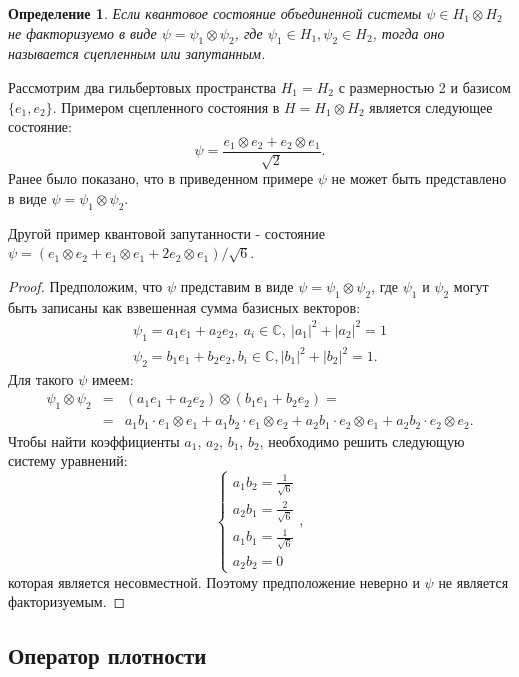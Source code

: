 \documentclass[%
master,         %
subf,           %
href,           %
,times         %
]{disser}
\numberwithin{equation}{section}
\numberwithin{figure}{section}
\newtheorem{definition}{Определение}[section]
\begin{document}
\begin{definition}
Если квантовое состояние объединенной системы $\psi\in H_1\otimes H_2$ не факторизуемо в виде  $\psi = \psi_1\otimes\psi_2$, где $\psi_1\in H_1, \psi_2\in H_2$, тогда оно называется сцепленным или запутанным. 
\end{definition}  
Рассмотрим два гильбертовых пространства $H_1 = H_2$ с размерностью 2 и базисом $\{e_1, e_2\}$. Примером сцепленного состояния в $H = H_1 \otimes H_2$ является следующее состояние: 
\[
\psi = \frac{e_1\otimes e_2 + e_2\otimes e_1}{\sqrt 2}.
\]
Ранее было показано, что в приведенном примере $\psi$ не может быть представлено в виде $\psi = \psi_1\otimes\psi_2$.

Другой пример квантовой запутанности - состояние $\psi = (e_1\otimes e_2 + e_1 \otimes e_1 + 2e_2 \otimes e_1) / \sqrt{6}$.

\begin{proof}
Предположим, что $\psi$ представим в виде $\psi = \psi_1\otimes\psi_2$, где 
$\psi_1$ и $\psi_2$ могут быть записаны как взвешенная сумма базисных векторов:
\begin{gather*}
	\psi_1 = a_1 e_1 + a_2 e_2,\ a_i\in \mathbb{C},\ |a_1|^2 + |a_2|^2 = 1 \\
	\psi_2 = b_1 e_1 + b_2 e_2, b_i\in \mathbb{C}, |b_1|^2 + |b_2|^2 = 1.
\end{gather*}
Для такого $\psi$ имеем:
\begin{eqnarray*}
	\psi_1 \otimes \psi_2 &=& (a_1 e_1 + a_2 e_2) \otimes (b_1 e_1 + b_2 e_2) = \\ &=&  
	a_1 b_1 \cdot e_1 \otimes e_1 + a_1 b_2 \cdot e_1 \otimes e_2 + 
	a_2 b_1 \cdot e_2 \otimes e_1 + a_2 b_2 \cdot e_2 \otimes e_2.
\end{eqnarray*}
Чтобы найти коэффициенты $a_1$, $a_2$, $b_1$, $b_2$, необходимо решить следующую систему уравнений:
$$
\begin{cases}
a_1 b_2 = \frac{1}{\sqrt{6}} \\
a_2 b_1 = \frac{2}{\sqrt{6}} \\
a_1 b_1 = \frac{1}{\sqrt{6}} \\
a_2 b_2 = 0
\end{cases},
$$
которая является несовместной. Поэтому предположение неверно и $\psi$ не является факторизуемым.
\end{proof}


\subsection{Оператор плотности}
\end{document}
